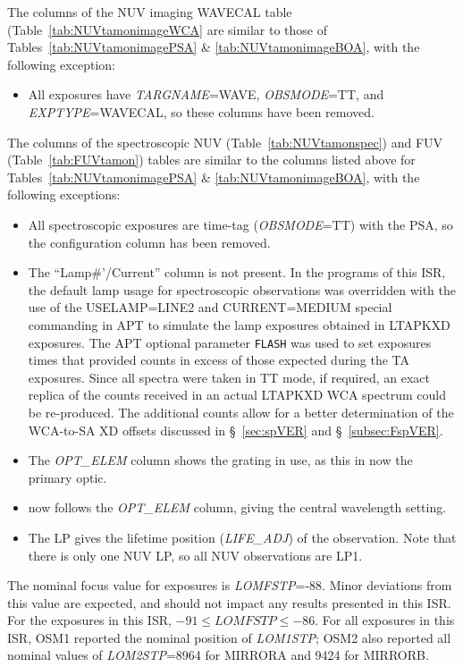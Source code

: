 The columns of the NUV imaging WAVECAL table (Table~\ref{tab:NUVtamonimageWCA} are similar to those of Tables~\ref{tab:NUVtamonimagePSA} \& \ref{tab:NUVtamonimageBOA}, with the following exception:
\begin{itemize}
\item All exposures have \textit{TARGNAME}=WAVE, \textit{OBSMODE}=TT, and \textit{EXPTYPE}=WAVECAL, so these columns have been removed.
\end{itemize}

The columns of the spectroscopic NUV (Table~\ref{tab:NUVtamonspec}) and FUV (Table~\ref{tab:FUVtamon}) tables are similar to the columns listed above for Tables~\ref{tab:NUVtamonimagePSA} \& \ref{tab:NUVtamonimageBOA}, with the following exceptions:
\begin{itemize}
\item All spectroscopic exposures are time-tag (\textit{OBSMODE}=TT) with the PSA, so the configuration column has been removed.
\item The ``Lamp\#'/Current'' column is not present. In the programs of this ISR, the default \plampone{} lamp usage for spectroscopic observations was overridden with the use of the \textsc{USELAMP=LINE2} and \textsc{CURRENT=MEDIUM} special commanding
in APT to simulate the lamp exposures obtained in \textsc{LTAPKXD} exposures.
The APT optional parameter \texttt{FLASH} was used to set \plamptwo{} exposures times that
provided counts in excess of those expected during the TA exposures.  Since all spectra were taken in TT mode,
if required, an exact replica of the counts received in an actual \textsc{LTAPKXD} WCA spectrum could be re-produced.
The additional counts allow for a better determination of the WCA-to-SA XD offsets discussed in \S~\ref{sec:spVER} and \S~\ref{subsec:FspVER}.
\item The \textit{OPT\_ELEM} column shows the grating in use, as this in now the primary optic.
\item \cenwave{} now follows the \textit{OPT\_ELEM} column, giving the central wavelength setting.
\item The LP gives the lifetime position (\textit{LIFE\_ADJ}) of the observation. Note that there is only one NUV LP, so all NUV observations are LP1.
\end{itemize}
\normalsize

The nominal focus value for  exposures is \textit{LOMFSTP}=-88. Minor deviations from this value are expected, and should not impact any results presented in this ISR.
For the exposures in this ISR, $-91\leq \textit{LOMFSTP} \leq-86 $. For all exposures in this ISR, OSM1 reported the nominal  position of \textit{LOM1STP}; OSM2
also reported all nominal values of \textit{LOM2STP}=8964 for MIRRORA and  9424 for MIRRORB.




